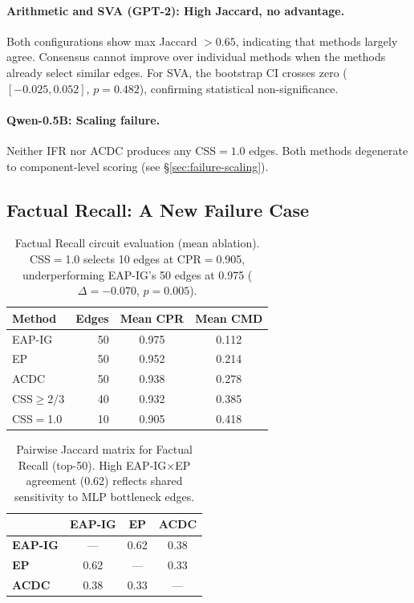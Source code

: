 \documentclass[11pt,a4paper]{article}
\newcommand{\css}{\textsc{CSS}}
\newcommand{\cpr}{\textsc{CPR}}
\newcommand{\cmd}{\textsc{CMD}}
\newcommand{\eapig}{\textsc{EAP-IG}}
\newcommand{\acdc}{\textsc{ACDC}}
\newcommand{\ep}{\textsc{EP}}
\newcommand{\ifr}{\textsc{IFR}}
\begin{document}
\paragraph{Arithmetic and SVA (GPT-2): High Jaccard, no advantage.} Both configurations show max Jaccard $>0.65$, indicating that methods largely agree. Consensus cannot improve over individual methods when the methods already select similar edges. For SVA, the bootstrap CI crosses zero ($[-0.025, 0.052]$, $p=0.482$), confirming statistical non-significance.

\paragraph{Qwen-0.5B: Scaling failure.} Neither \ifr{} nor \acdc{} produces any \css{}$=1.0$ edges. Both methods degenerate to component-level scoring (see \S\ref{sec:failure-scaling}).

\subsection{Factual Recall: A New Failure Case}
\label{sec:factual-recall}

\begin{table}[t]
\centering
\small
\begin{tabular}{lrcc}
\toprule
\textbf{Method} & \textbf{Edges} & \textbf{Mean \cpr{}} & \textbf{Mean \cmd{}} \\
\midrule
\eapig{}    & 50 & 0.975 & 0.112 \\
\ep{}       & 50 & 0.952 & 0.214 \\
\acdc{}     & 50 & 0.938 & 0.278 \\
CSS$\geq$2/3 & 40 & 0.932 & 0.385 \\
CSS$=$1.0  & 10 & 0.905 & 0.418 \\
\bottomrule
\end{tabular}
\caption{Factual Recall circuit evaluation (mean ablation). CSS$=$1.0 selects 10 edges at \cpr{}$=$0.905, underperforming \eapig{}'s 50 edges at 0.975 ($\Delta=-0.070$, $p=0.005$).}
\label{tab:factual-recall}
\end{table}

\begin{table}[t]
\centering
\small
\begin{tabular}{lccc}
\toprule
 & \textbf{EAP-IG} & \textbf{EP} & \textbf{ACDC} \\
\midrule
\textbf{EAP-IG} & --- & 0.62 & 0.38 \\
\textbf{EP}     & 0.62 & --- & 0.33 \\
\textbf{ACDC}   & 0.38 & 0.33 & --- \\
\bottomrule
\end{tabular}
\caption{Pairwise Jaccard matrix for Factual Recall (top-50). High EAP-IG$\times$EP agreement (0.62) reflects shared sensitivity to MLP bottleneck edges.}
\label{tab:factual-recall-jaccard}
\end{table}
\end{document}
